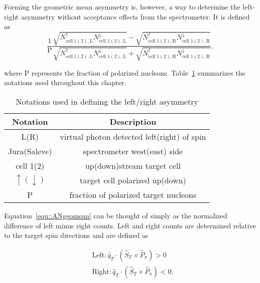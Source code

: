 Forming the geometric mean asymmetry is, however, a way to determine the
left-right asymmetry without acceptance effects from the spectrometer.  It is
defined as
\begin{equation}
  \label{equ::ANgeomean}
  \frac{1}{\mathrm{P}}\frac{\sqrt{N_{\mathrm{cell\;1(2),
          L}}^{\uparrow}N_{\mathrm{cell\;1(2), L}}^{\downarrow}} -
    \sqrt{N_{\mathrm{cell\;1(2), R}}^{\uparrow}N_{\mathrm{cell\;1(2),
          R}}^{\downarrow}} }{\sqrt{N_{\mathrm{cell\;1(2),
          L}}^{\uparrow}N_{\mathrm{cell\;1(2), L}}^{\downarrow}} +
    \sqrt{N_{\mathrm{cell\;1(2), R}}^{\uparrow}N_{\mathrm{cell\;1(2),
          R}}^{\downarrow}} },
\end{equation}

\noindent
where P represents the fraction of polarized
nucleons. Table~\ref{tab::ANnotations} summarizes the notations used throughout
this chapter.

\begin{table}[h!t]
  \centering
  \label{tab::ANnotations}
  \caption{Notations used in defining the left/right asymmetry}
  \begin{tabular}{ |c|c| }
    \hline
    \textbf{Notation}& \textbf{Description} \\
    \hline

    L(R) & virtual photon detected left(right) of spin \\ \hline
    Jura(Saleve) & spectrometer west(east) side \\ \hline
    cell 1(2)& up(down)stream target cell \\ \hline
    $\uparrow(\downarrow)$ & target cell polarized up(down) \\ \hline
    P& fraction of polarized target nucleons \\ \hline
    
  \end{tabular}
\end{table}

Equation~\ref{equ::ANgeomean} can be thought of simply as the normalized
difference of left minus right counts.  Left and right counts are determined
relative to the target spin directions and are defined as

\begin{equation}
  \label{equ::Defleftright}
  \begin{aligned}
    &\text{Left}: \hat{q}_T \cdot (\hat{S}_T \times \hat{P}_{\pi}) > 0 \\
    &\text{Right}: \hat{q}_T \cdot (\hat{S}_T \times \hat{P}_{\pi}) < 0, 
  \end{aligned}
\end{equation}

